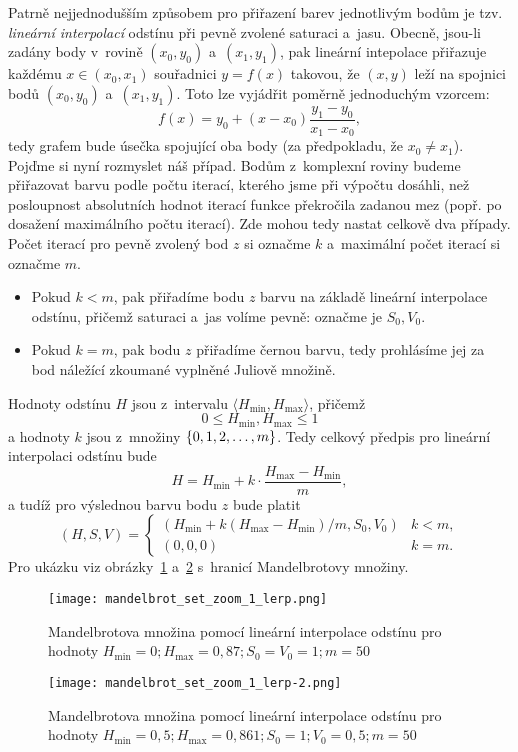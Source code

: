 Patrně nejjednodušším způsobem pro přiřazení barev jednotlivým bodům je tzv. \emph{lineární interpolací} odstínu při pevně zvolené saturaci a~jasu. Obecně, jsou-li zadány body v~rovině $(x_0,y_0)$ a~$(x_1,y_1)$, pak lineární intepolace přiřazuje každému $x\in(x_0,x_1)$ souřadnici $y=f(x)$ takovou, že $(x,y)$ leží na spojnici bodů $(x_0,y_0)$ a~$(x_1,y_1)$. Toto lze vyjádřit poměrně jednoduchým vzorcem:
\[f(x)=y_{0}+(x-x_{0}){\frac {y_{1}-y_{0}}{x_{1}-x_{0}}},\]
tedy grafem bude úsečka spojující oba body (za předpokladu, že $x_0\neq x_1$). Pojďme si nyní rozmyslet náš případ. Bodům z~komplexní roviny budeme přiřazovat barvu podle počtu iterací, kterého jsme při výpočtu dosáhli, než posloupnost absolutních hodnot iterací funkce překročila zadanou mez (popř. po dosažení maximálního počtu iterací). Zde mohou tedy nastat celkově dva případy. Počet iterací pro pevně zvolený bod $z$ si označme $k$ a~maximální počet iterací si označme $m$.
\begin{itemize}
    \item Pokud $k<m$, pak přiřadíme bodu $z$ barvu na základě lineární interpolace odstínu, přičemž saturaci a~jas volíme pevně: označme je $S_0,V_0$.
    \item Pokud $k=m$, pak bodu $z$ přiřadíme černou barvu, tedy prohlásíme jej za bod náležící zkoumané vyplněné Juliově množině.
\end{itemize}

Hodnoty odstínu $H$ jsou z~intervalu $\langle H_{\text{min}},H_{\text{max}}\rangle$, přičemž
\[0\leqslant H_{\text{min}},H_{\text{max}}\leqslant 1\]
a hodnoty $k$ jsou z~množiny $\left\{0,1,2,\ldots,m\right\}$. Tedy celkový předpis pro lineární interpolaci odstínu bude
\[H=H_{\text{min}}+k\cdot\frac{H_{\text{max}}-H_{\text{min}}}{m},\]
a tudíž pro výslednou barvu bodu $z$ bude platit 
\[(H,S,V)=\begin{cases}
    \left(H_{\text{min}}+k(H_{\text{max}}-H_{\text{min}})/m,S_0,V_0\right) & k<m,\\
    (0,0,0) & k=m.
\end{cases}\]
Pro ukázku viz obrázky~\ref{fig:mandelbrotova-mnozina-lerp-1} a~\ref{fig:mandelbrotova-mnozina-lerp-2} s~hranicí Mandelbrotovy množiny.
\begin{figure}[h]
    \centering
    \texttt{[image: mandelbrot\_set\_zoom\_1\_lerp.png]}
    \caption{Mandelbrotova množina pomocí lineární interpolace odstínu pro hodnoty $H_{\text{min}}=0;H_{\text{max}}=0{,}87;S_0=V_0=1;m=50$}
    \label{fig:mandelbrotova-mnozina-lerp-1}
\end{figure}
\begin{figure}[h]
    \centering
    \texttt{[image: mandelbrot\_set\_zoom\_1\_lerp-2.png]}
    \caption{Mandelbrotova množina pomocí lineární interpolace odstínu pro hodnoty $H_{\text{min}}=0{,}5;H_{\text{max}}=0{,}861;S_0=1;V_0=0{,}5;m=50$}
    \label{fig:mandelbrotova-mnozina-lerp-2}
\end{figure}

